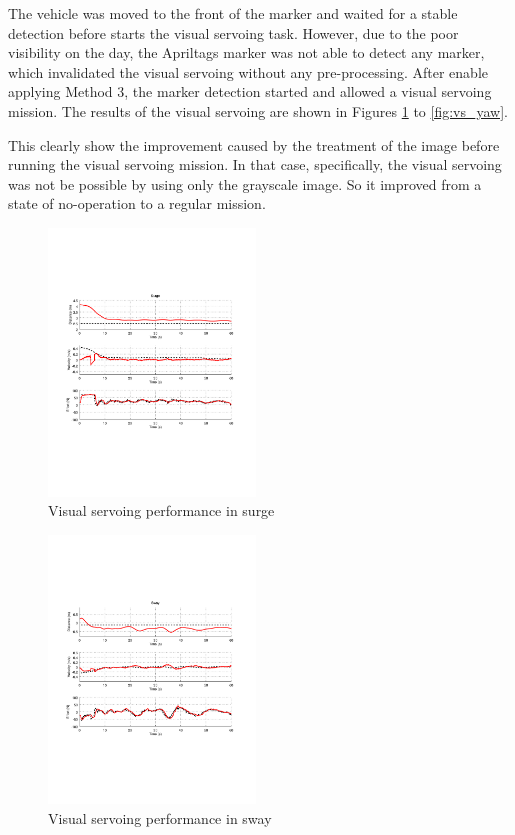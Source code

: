 \documentclass[conference, letterpaper]{IEEEtran}
\begin{document}
The vehicle was moved to the front of the marker and waited for a stable
detection before starts the visual servoing task.  However, due to the poor
visibility on the day, the Apriltags marker was not able to detect any marker,
which invalidated the visual servoing without any pre-processing.  After enable
applying Method 3, the marker detection started and allowed a visual servoing
mission.  The results of the visual servoing are shown in Figures
\ref{fig:vs_surge} to \ref{fig:vs_yaw}.

This clearly show the improvement caused by the treatment of the image before
running the visual servoing mission. In that case, specifically, the visual
servoing was not be possible by using only the grayscale image. So it improved
from a state of no-operation to a regular mission.

\begin{figure}[!ht]
	\centering
    \includegraphics[width=0.49\textwidth, trim={1.6cm 6.9cm 2.3cm 6.7cm}]{./fig/vs_surge.pdf}
    \caption{Visual servoing performance in surge}
	\label{fig:vs_surge}
\end{figure}
\begin{figure}[!ht]
	\centering
    \includegraphics[width=0.49\textwidth, trim={1.6cm 6.9cm 2.3cm 6.7cm}]{./fig/vs_sway.pdf}
    \caption{Visual servoing performance in sway}
	\label{fig:vs_sway}
\end{figure}
\end{document}
